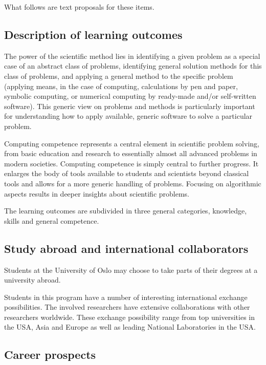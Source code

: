 \documentclass[%
oneside,                 %
final,                   %
10pt]{article}
\begin{document}
\noindent
What follows are text proposals for these items.

\subsection*{Description of learning outcomes}

The power of the scientific method lies in identifying a given problem
as a special case of an abstract class of problems, identifying
general solution methods for this class of problems, and applying a
general method to the specific problem (applying means, in the case of
computing, calculations by pen and paper, symbolic computing, or
numerical computing by ready-made and/or self-written software). This
generic view on problems and methods is particularly important for
understanding how to apply available, generic software to solve a
particular problem.

Computing competence represents a central element
in scientific problem solving, from basic education and research to
essentially almost all advanced problems in modern
societies. Computing competence is simply central to further
progress. It enlarges the body of tools available to students and
scientists beyond classical tools and allows for a more generic
handling of problems. Focusing on algorithmic aspects results in
deeper insights about scientific problems.

The learning outcomes are subdivided in three general categories, knowledge, skills and general competence.

\subsection*{Study abroad and international collaborators}

Students at the University of Oslo may choose to take parts of
their degrees at a university abroad.

Students in this program have a number of interesting international
exchange possibilities. The involved researchers have extensive
collaborations with other researchers worldwide. These exchange
possibility range from top universities in the USA, Asia and Europe as
well as leading National Laboratories in the USA.

\subsection*{Career prospects}
\end{document}

